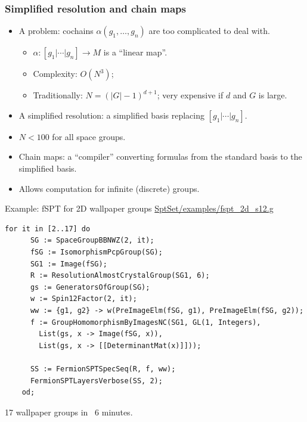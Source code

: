 \documentclass[xcolor=table, 11pt, aspectratio=169]{beamer}
\begin{document}
\begin{frame}
	\frametitle{Simplified resolution and chain maps}
	\begin{itemize}
		\item A problem: cochains $\alpha(g_1,\ldots,g_n)$ are too complicated to deal with.
		\begin{itemize}
      \item $\alpha: [g_1|\cdots|g_n]\rightarrow M$ is a ``linear map''.
      \item Complexity: $O(N^3)$;
      \item Traditionally: $N=(|G|-1)^{d+1}$; very expensive if $d$ and $G$ is large.
    \end{itemize}
		\item A simplified resolution: a simplified basis replacing $[g_1|\cdots|g_n]$.
		\item $N<100$ for all space groups.
		\item Chain maps: a ``compiler'' converting formulas from the standard basis to the simplified basis.
		\item Allows computation for infinite (discrete) groups.
	\end{itemize}
\end{frame}

\begin{frame}[fragile]{Example: fSPT for 2D wallpaper groups}
	\url{SptSet/examples/fspt_2d_s12.g}
	\begin{lstlisting}[basicstyle=\footnotesize]
    for it in [2..17] do
      SG := SpaceGroupBBNWZ(2, it);
      fSG := IsomorphismPcpGroup(SG);
      SG1 := Image(fSG);
      R := ResolutionAlmostCrystalGroup(SG1, 6);
      gs := GeneratorsOfGroup(SG);
      w := Spin12Factor(2, it);
      ww := {g1, g2} -> w(PreImageElm(fSG, g1), PreImageElm(fSG, g2));
      f := GroupHomomorphismByImagesNC(SG1, GL(1, Integers),
        List(gs, x -> Image(fSG, x)),
        List(gs, x -> [[DeterminantMat(x)]]));

      SS := FermionSPTSpecSeq(R, f, ww);
      FermionSPTLayersVerbose(SS, 2);
    od;
  \end{lstlisting}
  17 wallpaper groups in ~6 minutes.
\end{frame}
\end{document}
